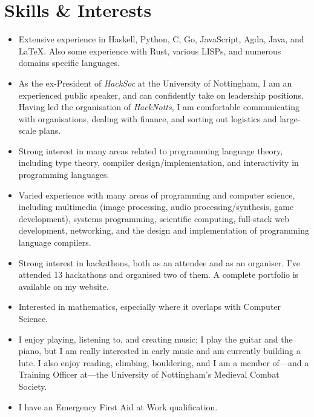 \documentclass[12pt]{article}
\begin{document}
\section*{Skills \& Interests}
\begin{itemize}
	\item Extensive experience in Haskell, Python, C, Go, JavaScript, Agda, Java, and \LaTeX. Also some experience with Rust, various LISPs, and numerous domains specific languages.
	\item As the ex-President of \textit{HackSoc} at the University of Nottingham, I am an experienced public speaker, and can confidently take on leadership positions. Having led the organisation of \textit{HackNotts}, I am comfortable communicating with organisations, dealing with finance, and sorting out logistics and large-scale plans.
	\item Strong interest in many areas related to programming language theory, including type theory, compiler design/implementation, and interactivity in programming languages.
	\item Varied experience with many areas of programming and computer science, including multimedia (image processing, audio processing/synthesis, game development), systems programming, scientific computing, full-stack web development, networking, and the design and implementation of programming language compilers.
	\item Strong interest in hackathons, both as an attendee and as an organiser. I've attended 13 hackathons and organised two of them. A complete portfolio is available on my website.
	\item Interested in mathematics, especially where it overlaps with Computer Science.
	\item I enjoy playing, listening to, and creating music; I play the guitar and the piano, but I am really interested in early music and am currently building a lute. I also enjoy reading, climbing, bouldering, and I am a member of---and a Training Officer at---the University of Nottingham's Medieval Combat Society.
	\item I have an Emergency First Aid at Work qualification.
\end{itemize}
\end{document}

